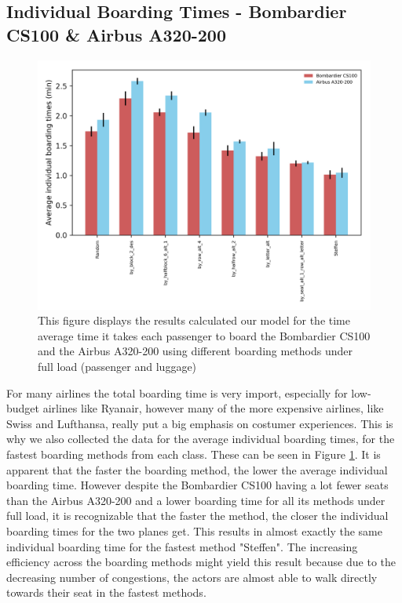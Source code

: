 \documentclass[11pt]{article}
\begin{document}
 \subsection{Individual Boarding Times - Bombardier CS100 \& Airbus A320-200}
	\begin{figure}
		\includegraphics[width=\linewidth]{../../code/AirplaneBoarding/data/figure3/figure3.png}
		\caption{This figure displays the results calculated our model for the time average time it takes each passenger to board the Bombardier CS100 and the Airbus A320-200 using different boarding methods under full load (passenger and luggage)}
		\label{figure3}
	\end{figure}
	For many airlines the total boarding time is very import, especially for low-budget airlines like Ryanair, however many of the more expensive airlines, like Swiss and Lufthansa, really put a big emphasis on costumer experiences. This is why we also collected the data for the average individual boarding times, for the fastest boarding methods from each class. These can be seen in Figure \ref{figure3}. It is apparent that the faster the boarding method, the lower the average individual boarding time. However despite the Bombardier CS100 having a lot fewer seats than the Airbus A320-200 and a lower boarding time for all its methods under full load, it is recognizable that the faster the method, the closer the individual boarding times for the two planes get. This results in almost exactly the same individual boarding time for the fastest method "Steffen". The increasing efficiency across the boarding methods might yield this result because due to the decreasing number of congestions, the actors are almost able to walk directly towards their seat in the fastest methods.
	
\end{document}
